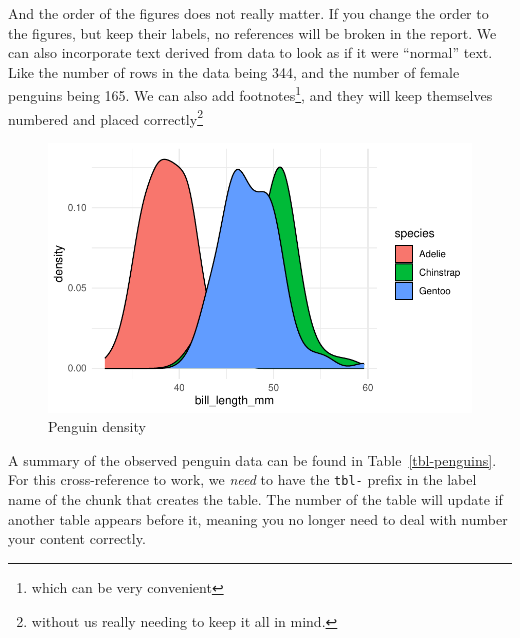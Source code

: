 \documentclass[
  letterpaper,
  DIV=11,
  numbers=noendperiod]{scrartcl}
\begin{document}
And the order of the figures does not really matter. If you change the
order to the figures, but keep their labels, no references will be
broken in the report. We can also incorporate text derived from data to
look as if it were ``normal'' text. Like the number of rows in the data
being 344, and the number of female penguins being 165. We can also add
footnotes\footnote{which can be very convenient}, and they will keep
themselves numbered and placed correctly\footnote{without us really
  needing to keep it all in mind.}

\begin{figure}

{\centering \includegraphics{03_pdf_example_files/figure-pdf/fig-penguin-density-1.pdf}

}

\caption{\label{fig-penguin-density}Penguin density}

\end{figure}

A summary of the observed penguin data can be found in
Table~\ref{tbl-penguins}. For this cross-reference to work, we
\emph{need} to have the \texttt{tbl-} prefix in the label name of the
chunk that creates the table. The number of the table will update if
another table appears before it, meaning you no longer need to deal with
number your content correctly.\\
\end{document}
